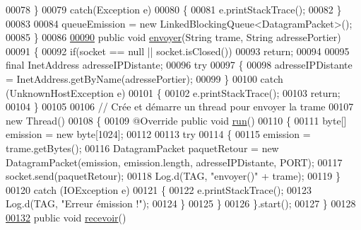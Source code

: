 \begin{DoxyCode}
00078         \}
00079         \textcolor{keywordflow}{catch}(Exception e)
00080         \{
00081             e.printStackTrace();
00082         \}
00083 
00084         queueEmission = \textcolor{keyword}{new} LinkedBlockingQueue<DatagramPacket>();
00085     \}
00086 
\hyperlink{classcom_1_1lasalle_1_1meeting_1_1_communication_a03f0e419513d7f33900dde412e2a4471}{00090}     \textcolor{keyword}{public} \textcolor{keywordtype}{void} \hyperlink{classcom_1_1lasalle_1_1meeting_1_1_communication_a03f0e419513d7f33900dde412e2a4471}{envoyer}(String trame, String adressePortier)
00091     \{
00092         \textcolor{keywordflow}{if}(socket == null || socket.isClosed())
00093             \textcolor{keywordflow}{return};
00094 
00095         \textcolor{keyword}{final} InetAddress adresseIPDistante;
00096         \textcolor{keywordflow}{try}
00097         \{
00098             adresseIPDistante = InetAddress.getByName(adressePortier);
00099         \}
00100         \textcolor{keywordflow}{catch} (UnknownHostException e)
00101         \{
00102             e.printStackTrace();
00103             \textcolor{keywordflow}{return};
00104         \}
00105 
00106         \textcolor{comment}{// Crée et démarre un thread pour envoyer la trame}
00107         \textcolor{keyword}{new} Thread()
00108         \{
00109             @Override \textcolor{keyword}{public} \textcolor{keywordtype}{void} \hyperlink{classcom_1_1lasalle_1_1meeting_1_1_communication_afe29bde1b4538990bd0a8c9b2d512efa}{run}()
00110             \{
00111                 byte[] emission = \textcolor{keyword}{new} byte[1024];
00112 
00113                 \textcolor{keywordflow}{try}
00114                 \{
00115                     emission = trame.getBytes();
00116                     DatagramPacket paquetRetour = \textcolor{keyword}{new} DatagramPacket(emission, emission.length, 
      adresseIPDistante, PORT);
00117                     socket.send(paquetRetour);
00118                     Log.d(TAG, \textcolor{stringliteral}{"envoyer()"} + trame);
00119                 \}
00120                 \textcolor{keywordflow}{catch} (IOException e)
00121                 \{
00122                     e.printStackTrace();
00123                     Log.d(TAG, \textcolor{stringliteral}{"Erreur émission !"});
00124                 \}
00125             \}
00126         \}.start();
00127     \}
00128 
\hyperlink{classcom_1_1lasalle_1_1meeting_1_1_communication_a0344b79faa04dded3468fb8dda6baa81}{00132}     \textcolor{keyword}{public} \textcolor{keywordtype}{void} \hyperlink{classcom_1_1lasalle_1_1meeting_1_1_communication_a0344b79faa04dded3468fb8dda6baa81}{recevoir}()

\end{DoxyCode}
